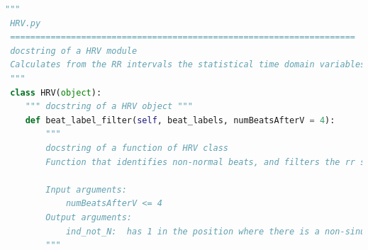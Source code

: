 \begin{lstlisting}[language=python,caption=HRV.py,label=docstring]
""" 
 HRV.py 
 ====================================================================
 docstring of a HRV module
 Calculates from the RR intervals the statistical time domain variables and the geometrical variables to characterize the heart rate variability (HRV).The RR intervals used are all of them previous to valid tachograms according to the conditions evaluated in the characterization of the heart rate turbulence (HRT). 
 """
 class HRV(object):
    """ docstring of a HRV object """
    def beat_label_filter(self, beat_labels, numBeatsAfterV = 4):
        """
        docstring of a function of HRV class
        Function that identifies non-normal beats, and filters the rr signal to produce a vector identifying the positions where are non-normal beats.

        Input arguments:
            numBeatsAfterV <= 4
        Output arguments:
            ind_not_N:  has 1 in the position where there is a non-sinusal beat as classified by the label information.
        """
\end{lstlisting}

